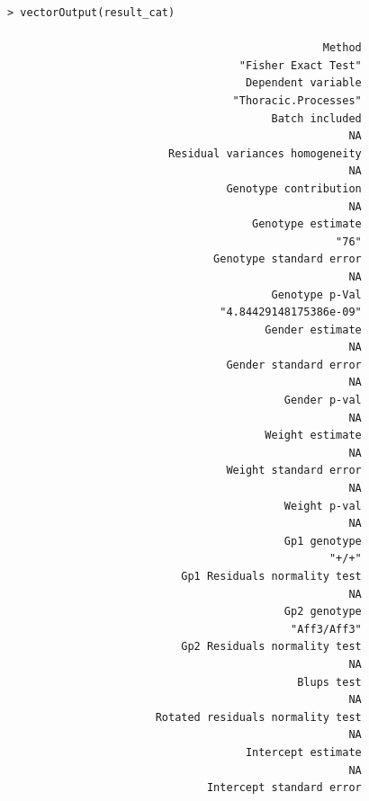 \documentclass[12pt,a4paper]{article}
\begin{document}
\begingroup
    \fontsize{8pt}{12pt}\selectfont
\begin{verbatim}
> vectorOutput(result_cat)

                                                 Method 
                                    "Fisher Exact Test" 
                                     Dependent variable 
                                   "Thoracic.Processes" 
                                         Batch included 
                                                     NA 
                         Residual variances homogeneity 
                                                     NA 
                                  Genotype contribution 
                                                     NA 
                                      Genotype estimate 
                                                   "76" 
                                Genotype standard error 
                                                     NA 
                                         Genotype p-Val 
                                 "4.84429148175386e-09" 
                                        Gender estimate 
                                                     NA 
                                  Gender standard error 
                                                     NA 
                                           Gender p-val 
                                                     NA 
                                        Weight estimate 
                                                     NA 
                                  Weight standard error 
                                                     NA 
                                           Weight p-val 
                                                     NA 
                                           Gp1 genotype 
                                                  "+/+" 
                           Gp1 Residuals normality test 
                                                     NA 
                                           Gp2 genotype 
                                            "Aff3/Aff3" 
                           Gp2 Residuals normality test 
                                                     NA 
                                             Blups test 
                                                     NA 
                       Rotated residuals normality test 
                                                     NA 
                                     Intercept estimate 
                                                     NA 
                               Intercept standard error 

\end{verbatim}
\end{document}
